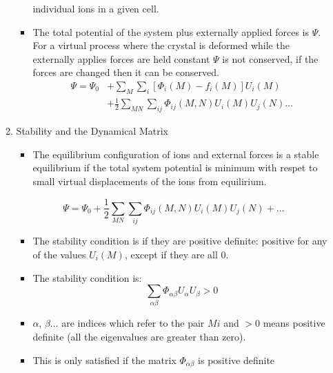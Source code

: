 \documentclass[11pt]{article}
\begin{document}
\begin{enumerate}
\begin{enumerate}
\begin{itemize}
individual ions in a given cell.
\item The total potential of the system plus externally applied forces is
\(\Psi\). For a virtual process where the crystal is deformed while the
externally applies forces are held constant \(\Psi\) is not conserved, if
the forces are changed then it can be conserved. 
\begin{align}
\Psi = \Psi_{0} &+ \sum_{M}\sum_{i}[\Phi_{i}(M) - f_i(M)]U_{i}(M)\\
     &+ \frac{1}{2}\sum_{MN}\sum_{ij}\Phi_{ij}(M,N)U_i(M)U_j(N) \dots
\end{align}
\end{itemize}
\item Stability and the Dynamical Matrix
\label{sec:org99d151c}
\begin{itemize}
\item The equilibrium configuration of ions and external forces is a stable
equilibrium if the total system potential is minimum with respet to
small virtual displacements of the ions from equilirium.
\end{itemize}
\[\Psi = \Psi_{0}+
     \frac{1}{2}\sum_{MN}\sum_{ij}\Phi_{ij}(M,N)U_i(M)U_j(N) + \dots \]
\begin{itemize}
\item The stability condition is if they are positive definite: positive for
any of the values \(U_{i}(M)\), except if they are all 0.
\item The stability condition is:
\[ \sum_{\alpha \beta} \Phi_{\alpha\beta}U_{\alpha}U_{\beta} > 0 \]
\item \(\alpha\), \(\beta \dots\) are indices which refer to the pair  \(Mi\) and
\(>0\) means positive definite (all the eigenvalues are greater than zero).
\item This is only satisfied if the matrix \(\Phi_{\alpha\beta}\) is positive definite
\end{itemize}
\end{enumerate}
\end{enumerate}
\end{document}

